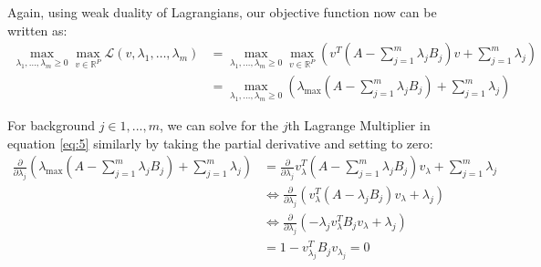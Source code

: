 \documentclass[12pt]{article}
\begin{document}
Again, using weak duality of Lagrangians, our objective function now can be written as:
\begin{align}
  \max_{\lambda_1,\ldots,\lambda_m \geq 0}{\max_{v\in \mathbb{R}^{P}}{\mathcal{L}\left(v, \lambda_1, \ldots, \lambda_m\right)}}%
                                                                                                                                &=\max_{\lambda_1,\ldots,\lambda_m \geq 0}{\max_{v\in \mathbb{R}^{P}}{\left(v^T\left(A - \sum^{m}_{j = 1}{\lambda_j B_j}\right)v + \sum^{m}_{j=1}{\lambda_j}\right)}} \nonumber\\
                                                                                                                                &=\max_{\lambda_1,\ldots,\lambda_m \geq 0}{\left(\lambda_{\text{max}}\left(A - \sum^{m}_{j = 1}{\lambda_j B_j}\right) + \sum^{m}_{j=1}{\lambda_j}\right)} \label{eq:5}
\end{align}

For background $j \in 1,...,m$, we can solve for the $j$th Lagrange Multiplier in equation \ref{eq:5} similarly by taking the partial derivative and setting to zero:
\begin{align}
    \frac{\partial}{\partial \lambda_j}\left(\lambda_{\text{max}}\left(A - \sum^{m}_{j = 1}{\lambda_j B_j}\right) + \sum^{m}_{j=1}{\lambda_j}\right)&=\frac{\partial}{\partial \lambda_j}v_{\lambda}^T\left(A - \sum^{m}_{j = 1}{\lambda_j B_j}\right)v_{\lambda} + \sum^{m}_{j=1}{\lambda_j}\nonumber\\
                                                                                                                                                    &\Leftrightarrow \frac{\partial}{\partial \lambda_j}\left(v_{\lambda}^T\left(A - \lambda_j B_j \right)v_{\lambda}+\lambda_j\right)\nonumber \\ 
                                                                                                                        &\Leftrightarrow \frac{\partial}{\partial \lambda_j}\left(-\lambda_j v_{\lambda}^T  B_j v_{\lambda} +\lambda_j \right)\nonumber \\ 
                                                                                                                        &= 1-v_{\lambda_j}^{T}B_j v_{\lambda_j} = 0 \label{eq:6}
\end{align}
\end{document}

